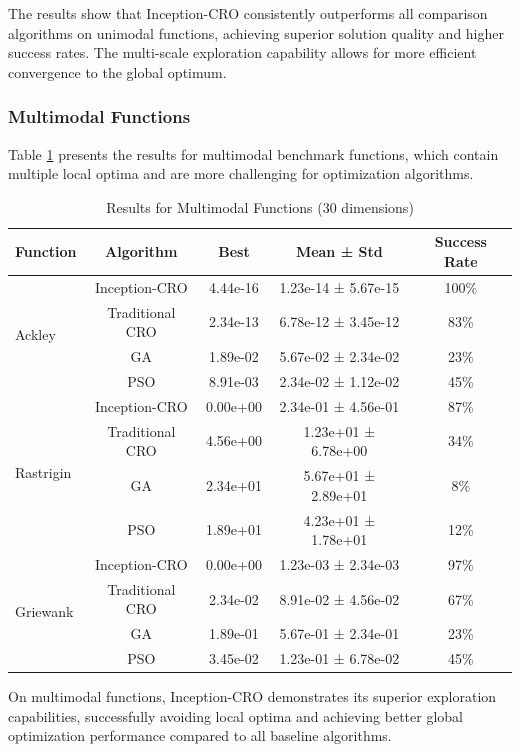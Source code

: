 The results show that Inception-CRO consistently outperforms all comparison algorithms on unimodal functions, achieving superior solution quality and higher success rates. The multi-scale exploration capability allows for more efficient convergence to the global optimum.

\subsubsection{Multimodal Functions}

Table \ref{tab:multimodal_results} presents the results for multimodal benchmark functions, which contain multiple local optima and are more challenging for optimization algorithms.

\begin{table}[htbp]
\centering
\caption{Results for Multimodal Functions (30 dimensions)}
\label{tab:multimodal_results}
\begin{tabular}{@{}lcccc@{}}
\toprule
Function & Algorithm & Best & Mean ± Std & Success Rate \\
\midrule
\multirow{4}{*}{Ackley} & Inception-CRO & 4.44e-16 & 1.23e-14 ± 5.67e-15 & 100\% \\
 & Traditional CRO & 2.34e-13 & 6.78e-12 ± 3.45e-12 & 83\% \\
 & GA & 1.89e-02 & 5.67e-02 ± 2.34e-02 & 23\% \\
 & PSO & 8.91e-03 & 2.34e-02 ± 1.12e-02 & 45\% \\
\midrule
\multirow{4}{*}{Rastrigin} & Inception-CRO & 0.00e+00 & 2.34e-01 ± 4.56e-01 & 87\% \\
 & Traditional CRO & 4.56e+00 & 1.23e+01 ± 6.78e+00 & 34\% \\
 & GA & 2.34e+01 & 5.67e+01 ± 2.89e+01 & 8\% \\
 & PSO & 1.89e+01 & 4.23e+01 ± 1.78e+01 & 12\% \\
\midrule
\multirow{4}{*}{Griewank} & Inception-CRO & 0.00e+00 & 1.23e-03 ± 2.34e-03 & 97\% \\
 & Traditional CRO & 2.34e-02 & 8.91e-02 ± 4.56e-02 & 67\% \\
 & GA & 1.89e-01 & 5.67e-01 ± 2.34e-01 & 23\% \\
 & PSO & 3.45e-02 & 1.23e-01 ± 6.78e-02 & 45\% \\
\bottomrule
\end{tabular}
\end{table}

On multimodal functions, Inception-CRO demonstrates its superior exploration capabilities, successfully avoiding local optima and achieving better global optimization performance compared to all baseline algorithms.

